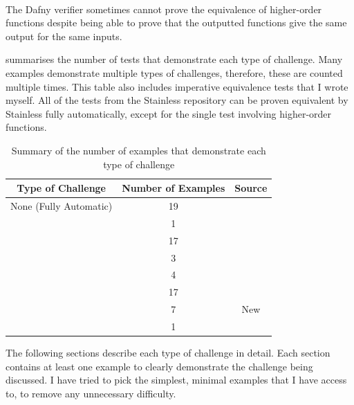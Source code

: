 \paragraph{} The Dafny verifier sometimes cannot prove the equivalence of higher-order functions despite being able to prove that the outputted functions give the same output for the same inputs.

 summarises the number of tests that demonstrate each type of challenge. Many examples demonstrate multiple types of challenges, therefore, these are counted multiple times. This table also includes imperative equivalence tests that I wrote myself. All of the tests from the Stainless repository can be proven equivalent by Stainless fully automatically, except for the single test involving higher-order functions. 

\begin{table}[ht]
  \centering
  \begin{tabular}{ |c|c|c| } 
  \hline
  Type of Challenge & Number of Examples & Source \\
  \hline
  None (Fully Automatic) & 19 & \parencite{StainlessFrontendsBenchmarks} \\
  \hline
  \nameref{sec:counterexamples} & 1 & \parencite{StainlessFrontendsBenchmarks} \\ 
  \hline
  \nameref{sec:equivalence-lemmas} & 17 & \parencite{StainlessFrontendsBenchmarks} \\
  \hline 
  \nameref{sec:auxiliary-lemmas} & 3 & \parencite{StainlessFrontendsBenchmarks} \\
  \hline 
  \nameref{sec:induction} & 4 & \parencite{StainlessFrontendsBenchmarks} \\
  \hline
  \nameref{sec:termination} & 17 & \parencite{StainlessFrontendsBenchmarks} \\
  \hline
  \nameref{sec:imperative-equivalence} & 7 & New \\
  \hline
  \nameref{sec:higher-order} & 1 & \parencite{StainlessFrontendsBenchmarks} \\
  \hline
  \end{tabular}
  \caption{Summary of the number of examples that demonstrate each type of challenge}
  \label{tbl:challenges-summary}
\end{table}

The following sections describe each type of challenge in detail. Each section contains at least one example to clearly demonstrate the challenge being discussed. I have tried to pick the simplest, minimal examples that I have access to, to remove any unnecessary difficulty. 

